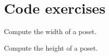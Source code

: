 
\section{\usebox{\chaptergear} Code exercises}

\begin{codeexercise}
    Compute the width of a poset.
\end{codeexercise}

\begin{codeexercise}
    Compute the height of a poset.
\end{codeexercise}


